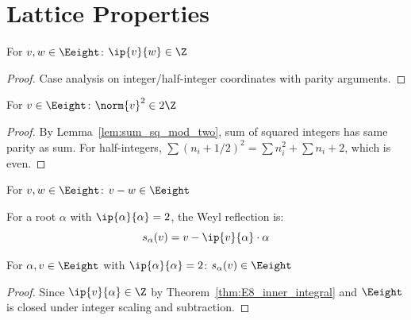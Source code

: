 \section{Lattice Properties}


\begin{theorem}\label{thm:E8_inner_integral}
    \leanok
    For $v, w \in \Eeight$: $\ip{v}{w} \in \Z$
\end{theorem}
\begin{proof}
    Case analysis on integer/half-integer coordinates with parity arguments.
\end{proof}

\begin{theorem}\label{thm:E8_norm_sq_even}
    \leanok
    For $v \in \Eeight$: $\norm{v}^2 \in 2\Z$
\end{theorem}
\begin{proof}
    By Lemma~\ref{lem:sum_sq_mod_two}, sum of squared integers has same parity as sum.
    For half-integers, $\sum(n_i + 1/2)^2 = \sum n_i^2 + \sum n_i + 2$, which is even.
\end{proof}

\begin{theorem}\label{thm:E8_sub_closed}
    \leanok
    For $v, w \in \Eeight$: $v - w \in \Eeight$
\end{theorem}

\begin{definition}\label{def:E8_reflection}
    \leanok
    For a root $\alpha$ with $\ip{\alpha}{\alpha} = 2$, the Weyl reflection is:
    \[
        s_\alpha(v) = v - \ip{v}{\alpha} \cdot \alpha
    \]
\end{definition}

\begin{theorem}\label{thm:reflect_preserves_lattice}
    \leanok
    For $\alpha, v \in \Eeight$ with $\ip{\alpha}{\alpha} = 2$:
    $s_\alpha(v) \in \Eeight$
\end{theorem}
\begin{proof}
    Since $\ip{v}{\alpha} \in \Z$ by Theorem~\ref{thm:E8_inner_integral} and
    $\Eeight$ is closed under integer scaling and subtraction.
\end{proof}

